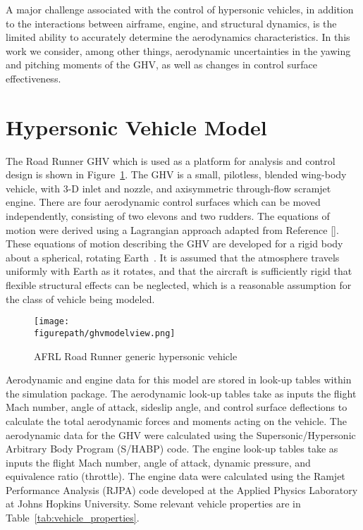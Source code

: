\documentclass[]{../sty/aiaa-tc}
\newcommand{\figurepath}{../fig}
\begin{document}
  A major challenge associated with the control of hypersonic vehicles, in addition to the interactions between airframe, engine, and structural dynamics, is the limited ability to accurately determine the aerodynamics characteristics.\cite{maughmer1989prediction,schmidt1991dynamics2}
  In this work we consider, among other things, aerodynamic uncertainties in the yawing and pitching moments of the GHV, as well as changes in control surface effectiveness.

  \section{Hypersonic Vehicle Model}\label{sec:hsvmodel}

  The Road Runner GHV which is used as a platform for analysis and control design is shown in Figure~\ref{fig:ghv_clouds}.
  The GHV is a small, pilotless, blended wing-body vehicle, with 3-D inlet and nozzle, and axisymmetric through-flow scramjet engine.
  There are four aerodynamic control surfaces which can be moved independently, consisting of two elevons and two rudders.
  The equations of motion were derived using a Lagrangian approach adapted from Reference [].
  These equations of motion describing the GHV are developed for a rigid body about a spherical, rotating Earth\ \cite{book.etkin.1972,book.stevenslewis.2003}.
  It is assumed that the atmosphere travels uniformly with Earth as it rotates, and that the aircraft is sufficiently rigid that flexible structural effects can be neglected, which is a reasonable assumption for the class of vehicle being modeled.

  \begin{figure}[H]
    \begin{center}
      \texttt{[image: \\figurepath/ghvmodelview.png]}
      \vspace{-0.1in}
      \caption{AFRL Road Runner generic hypersonic vehicle\label{fig:ghv_clouds}}
    \end{center}
  \end{figure}

  Aerodynamic and engine data for this model are stored in look-up tables within the simulation package.
  The aerodynamic look-up tables take as inputs the flight Mach number, angle of attack, sideslip angle, and control surface deflections to calculate the total aerodynamic forces and moments acting on the vehicle.
  The aerodynamic data for the GHV were calculated using the Supersonic/Hypersonic Arbitrary Body Program (S/HABP) code.
  The engine look-up tables take as inputs the flight Mach number, angle of attack, dynamic pressure, and equivalence ratio (throttle).
  The engine data were calculated using the Ramjet Performance Analysis (RJPA) code developed at the Applied Physics Laboratory at Johns Hopkins University.
  Some relevant vehicle properties are in Table~\ref{tab:vehicle_properties}.
\end{document}
